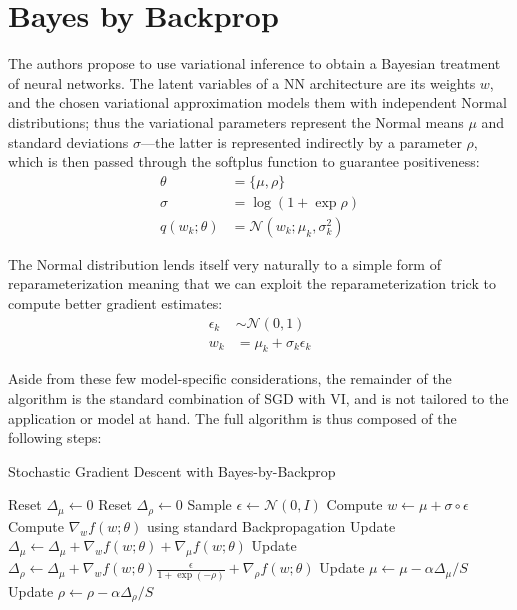 \documentclass[11pt]{article}
\begin{document}
\section{Bayes by Backprop} \label{sec:bayes_by_backprop}

The authors propose to use variational inference to obtain a Bayesian treatment
of neural networks.  The latent variables of a NN architecture are its weights
$w$, and the chosen variational approximation models them with independent
Normal distributions;  thus the variational parameters represent the Normal
means $\mu$ and standard deviations $\sigma$---the latter is represented
indirectly by a parameter $\rho$, which is then passed through the softplus
function to guarantee positiveness:
%
\begin{align}
  \theta &= \{ \mu, \rho \} \\
  \sigma &= \log(1 + \exp\rho) \\
  q(w_k; \theta) &= \mathcal{N}(w_k; \mu_k, \sigma_k^2)
\end{align}


The Normal distribution lends itself very naturally to a simple form of
reparameterization meaning that we can exploit the reparameterization trick to
compute better gradient estimates:
%
\begin{align}
  \epsilon_k &\sim \mathcal{N}(0, 1) \\
  w_k &= \mu_k + \sigma_k \epsilon_k
\end{align}

Aside from these few model-specific considerations, the remainder of the
algorithm is the standard combination of SGD with VI, and is not tailored to
the application or model at hand.  The full algorithm is thus composed of the
following steps:

\begin{algorithm}
\caption{Stochastic Gradient Descent with Bayes-by-Backprop}
\begin{algorithmic}[1]
  \Repeat
  \State Reset $\Delta_\mu \gets 0$
  \State Reset $\Delta_\rho \gets 0$
  \State Sample $\epsilon \gets \mathcal{N}(0, I)$
  \State Compute $w \gets \mu + \sigma \circ \epsilon$
  \State Compute $\nabla_w f(w; \theta)$ using standard Backpropagation
  \State Update $\Delta_\mu \gets \Delta_\mu + \nabla_w f(w; \theta) + \nabla_\mu f(w; \theta)$
  \State Update $\Delta_\rho \gets \Delta_\mu + \nabla_w f(w; \theta) \frac{\epsilon}{1+\exp(-\rho)} + \nabla_\rho f(w; \theta)$
  \EndFor
  \State Update $\mu \gets \mu - \alpha \Delta_\mu / S$
  \State Update $\rho \gets \rho - \alpha \Delta_\rho / S$
\end{algorithmic}
\end{algorithm}
\end{document}

